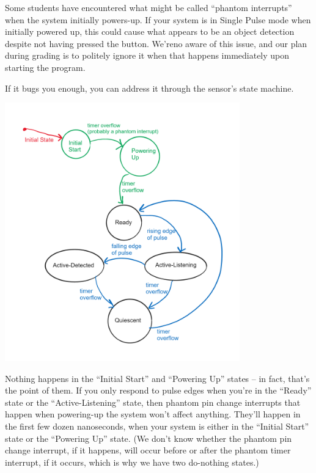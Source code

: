 Some students have encountered what might be called ``phantom interrupts'' when the system initially powers-up.
If your system is in Single Pulse mode when initially powered up, this could cause what appears to be an object detection despite not having pressed the button.
We'reno aware of this issue, and our plan during grading is to politely ignore it when that happens immediately upon starting the program.

If it bugs you enough, you can address it through the sensor’s state machine.

\includegraphics[width=4in]{noPhantomInterrupts}

Nothing happens in the ``Initial Start'' and ``Powering Up'' states – in fact, that’s the point of them.
If you only respond to pulse edges when you’re in the ``Ready'' state or the ``Active-Listening'' state, then phantom pin change interrupts that happen when powering-up the system won’t affect anything.
They’ll happen in the first few dozen nanoseconds, when your system is either in the ``Initial Start'' state or the ``Powering Up'' state.
(We don’t know whether the phantom pin change interrupt, if it happens, will occur before or after the phantom timer interrupt, if it occurs, which is why we have two do-nothing states.)